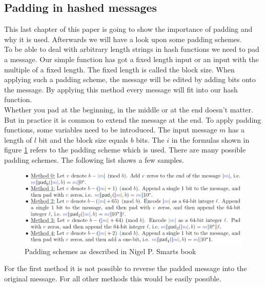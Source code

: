 \documentclass[a4paper,11pt, twoside]{article}
\begin{document}
\subsection{Padding in hashed messages}
This last chapter of this paper is going to show the importance of padding and why it is used. Afterwards we will have a look upon some padding schemes.\newline\\[0.1cm]
To be able to deal with arbitrary length strings in hash functions we need to pad a message. Our simple function has got a fixed length input or an input with the multiple of a fixed length. The fixed length is called the block size. When applying such a padding scheme, the message will be edited by adding bits onto the message. By applying this method every message will fit into our hash function.\newline\\[0.1cm]
Whether you pad at the beginning, in the middle or at the end doesn't matter. But in practice it is common to extend the message at the end.
To apply padding functions, some variables need to be introduced. The input message $m$ has a length of $l$ bit and the block size equals $b$ bits. The $i$ in the formulas shown in figure \ref{fig:padding_schemes} refers to the padding scheme which is used. There are many possible padding schemes. The following list shows a few samples.
\begin{figure}[H]
	\centering
	\includegraphics[scale=0.6]{figures/Padding_Schemes.png}
	\caption{Padding schemes as described in Nigel P. Smarts book}
	\label{fig:padding_schemes}
\end{figure}
For the first method it is not possible to reverse the padded message into the original message. For all other methods this would be easily possible. 
\end{document}
